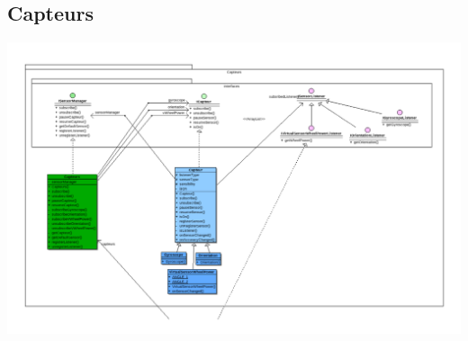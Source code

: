 \documentclass[10pt,a4paper]{article}
\begin{document}
	\subsection{Capteurs}
	\includegraphics[width=15 cm]{diagramme1.pdf} \\
	
\end{document}

